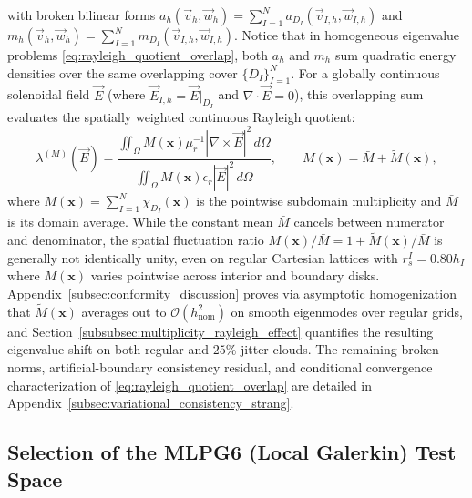\documentclass[VANCOUVER,Times1COL]{WileyNJD-v5}
\begin{document}
with broken bilinear forms $a_h(\vec{v}_h, \vec{w}_h) = \sum_{I=1}^N a_{D_I}(\vec{v}_{I,h}, \vec{w}_{I,h})$ and $m_h(\vec{v}_h, \vec{w}_h) = \sum_{I=1}^N m_{D_I}(\vec{v}_{I,h}, \vec{w}_{I,h})$. Notice that in homogeneous eigenvalue problems \eqref{eq:rayleigh_quotient_overlap}, both $a_h$ and $m_h$ sum quadratic energy densities over the same overlapping cover $\{D_I\}_{I=1}^N$. For a globally continuous solenoidal field $\vec{E}$ (where $\vec{E}_{I,h} = \vec{E}|_{D_I}$ and $\nabla \cdot \vec{E} = 0$), this overlapping sum evaluates the spatially weighted continuous Rayleigh quotient:
\begin{equation}
    \lambda^{(M)}(\vec{E}) = \frac{\iint_{\Omega} M(\mathbf{x}) \mu_r^{-1} |\nabla \times \vec{E}|^2 \, d\Omega}{\iint_{\Omega} M(\mathbf{x}) \epsilon_r |\vec{E}|^2 \, d\Omega}, \qquad M(\mathbf{x}) = \bar{M} + \widetilde{M}(\mathbf{x}),
    \label{eq:multiplicity_rayleigh_quotient}
\end{equation}
where $M(\mathbf{x}) = \sum_{I=1}^N \chi_{D_I}(\mathbf{x})$ is the pointwise subdomain multiplicity and $\bar{M}$ is its domain average. While the constant mean $\bar{M}$ cancels between numerator and denominator, the spatial fluctuation ratio $M(\mathbf{x})/\bar{M} = 1 + \widetilde{M}(\mathbf{x})/\bar{M}$ is generally not identically unity, even on regular Cartesian lattices with $r_s^I = 0.80 h_I$ where $M(\mathbf{x})$ varies pointwise across interior and boundary disks. Appendix~\ref{subsec:conformity_discussion} proves via asymptotic homogenization that $\widetilde{M}(\mathbf{x})$ averages out to $\mathcal{O}(h_{\mathrm{nom}}^2)$ on smooth eigenmodes over regular grids, and Section~\ref{subsubsec:multiplicity_rayleigh_effect} quantifies the resulting eigenvalue shift on both regular and $25\%$-jitter clouds. The remaining broken norms, artificial-boundary consistency residual, and conditional convergence characterization of \eqref{eq:rayleigh_quotient_overlap} are detailed in Appendix~\ref{subsec:variational_consistency_strang}.

\subsection{Selection of the MLPG6 (Local Galerkin) Test Space}
\label{subsec:mlpg6_selection}
\end{document}
